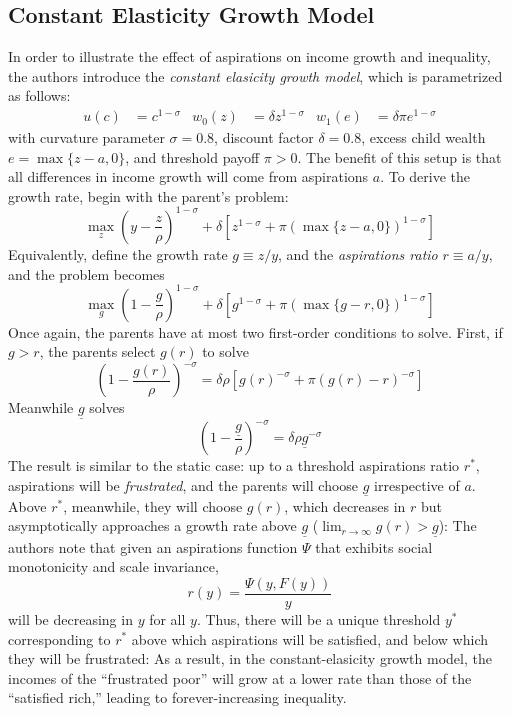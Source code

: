 \documentclass[11pt]{article}
\begin{document}
    \subsection{Constant Elasticity Growth Model}
    In order to illustrate the effect of aspirations on income growth and inequality, the authors introduce the \textit{constant elasicity growth model}, which is parametrized as follows:
    \begin{align*}
        u(c) &= c^{1 - \sigma} & w_0(z) &= \delta z^{1 - \sigma} & w_1(e) &= \delta \pi e^{1 - \sigma}
    \end{align*}
    with curvature parameter \( \sigma = 0.8 \), discount factor \( \delta = 0.8 \), excess child wealth \( e = \max\{z - a, 0\} \), and threshold payoff \( \pi > 0 \). The benefit of this setup is that all differences in income growth will come from aspirations \( a \). To derive the growth rate, begin with the parent's problem:
    \[\max_z \left(y - \frac{z}{\rho}\right)^{1 - \sigma} + \delta\left[z^{1 - \sigma} + \pi \left(\max\{z - a, 0\}\right)^{1 - \sigma}\right]\]
    Equivalently, define the growth rate \( g\equiv z / y \), and the \textit{aspirations ratio} \( r\equiv a / y \), and the problem becomes 
    \[\max_g \left(1 - \frac{g}{\rho}\right)^{1 - \sigma} + \delta\left[g^{1 - \sigma} + \pi \left(\max\{g - r, 0\}\right)^{1 - \sigma}\right]\]
    Once again, the parents have at most two first-order conditions to solve. First, if \( g > r \), the parents select \( g(r) \) to solve 
    \[\left(1 - \frac{g(r)}{\rho}\right)^{- \sigma} = \delta\rho\left[g(r)^{- \sigma} + \pi \left(g(r) - r\right)^{-\sigma}\right]\]
    Meanwhile \( \underline{g} \) solves
    \[\left(1 - \frac{\underline{g}}{\rho}\right)^{-\sigma} = \delta\rho \underline{g}^{-\sigma} \]
    The result is similar to the static case: up to a threshold aspirations ratio \( r^* \), aspirations will be \textit{frustrated}, and the parents will choose \( \underline{g} \) irrespective of \( a \). Above \( r^* \), meanwhile, they will choose \( g(r) \), which decreases in \( r \) but asymptotically approaches a growth rate above \( \underline{g} \) (\( \lim_{r\to\infty} g(r) > \underline{g} \)): 
    The authors note that given an aspirations function \( \Psi \) that exhibits social monotonicity and scale invariance, 
    \[r(y) = \frac{\Psi(y, F(y))}{y}\]
    will be decreasing in \( y \) for all \( y \). Thus, there will be a unique threshold \( y^* \) corresponding to \( r^* \) above which aspirations will be satisfied, and below which they will be frustrated:
    As a result, in the constant-elasicity growth model, the incomes of the ``frustrated poor'' will grow at a lower rate than those of the ``satisfied rich,'' leading to forever-increasing inequality. 
\end{document}
